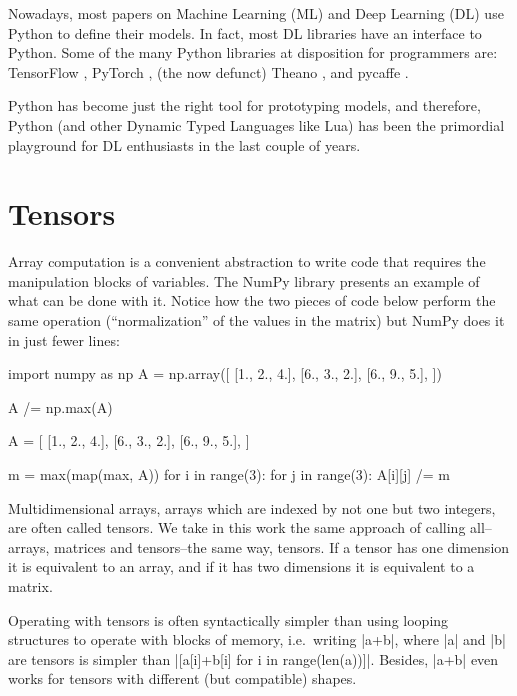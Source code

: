Nowadays, most papers on Machine Learning (ML) and Deep Learning (DL)
use Python to define their models. In fact, most DL libraries have an
interface to Python. Some of the many Python libraries at disposition
for programmers are: TensorFlow \autocite{abadi_tensorflow_2016},
PyTorch \autocite{paszke2017pytorch}, (the now defunct) Theano
\autocite{bergstra2011theano}, and pycaffe \autocite[as part of the
Caffe framework]{jia2014caffe}.

Python has become just the right tool for prototyping models, and
therefore, Python (and other Dynamic Typed Languages like Lua) has been
the primordial playground for DL enthusiasts in the last couple of
years.

\section{Tensors}\label{tensors}

Array computation is a convenient abstraction to write code that
requires the manipulation blocks of variables. The NumPy library
presents an example of what can be done with it. Notice how the two
pieces of code below perform the same operation (\enquote{normalization}
of the values in the matrix) but NumPy does it in just fewer lines:

\begin{pythoncode}
import numpy as np
A = np.array([
  [1., 2., 4.],
  [6., 3., 2.],
  [6., 9., 5.],
])

A /= np.max(A)
\end{pythoncode}

\begin{pythoncode}
A = [
  [1., 2., 4.],
  [6., 3., 2.],
  [6., 9., 5.],
]

m = max(map(max, A))
for i in range(3):
  for j in range(3):
    A[i][j] /= m
\end{pythoncode}

Multidimensional arrays, arrays which are indexed by not one but two
integers, are often called tensors. We take in this work the same
approach of calling all--arrays, matrices and tensors--the same way,
tensors. If a tensor has one dimension it is equivalent to an array, and
if it has two dimensions it is equivalent to a matrix.

Operating with tensors is often syntactically simpler than using looping
structures to operate with blocks of memory, i.e.~writing \pycode|a+b|,
where \pycode|a| and \pycode|b| are tensors is simpler than
\pycode|[a[i]+b[i] for i in range(len(a))]|. Besides,
\pycode|a+b| even works for tensors with different (but compatible)
shapes.


